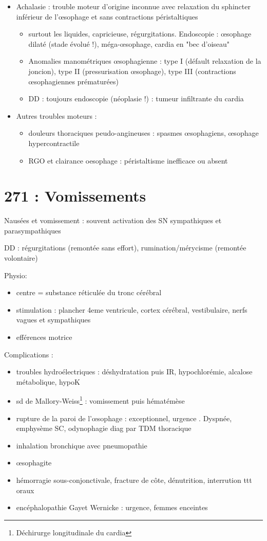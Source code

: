 \documentclass[11pt]{article}
\begin{document}
\begin{itemize}
\item Achalasie : trouble moteur d'origine inconnue avec relaxation du sphincter
inférieur de l'\oe{}sophage et sans contractions péristaltiques
\begin{itemize}
\item surtout les liquides, capricieuse, régurgitations. Endoscopie : \oe{}sophage
dilaté (stade évolué !), méga-\oe{}sophage, cardia en "bec d'oiseau"
\item Anomalies manométriques \oe{}sophagienne : type I (défault relaxation de la
joncion), type II (pressurisation \oe{}sophage), type III (contractions
\oe{}sophagiennes prématurées)
\item DD : toujours endoscopie (néoplasie !) : tumeur infiltrante du cardia
\end{itemize}
\item Autres troubles moteurs : 
\begin{itemize}
\item douleurs thoraciques peudo-angineuses : spasmes \oe{}sophagiens, \oe{}sophage
hypercontractile
\item RGO et clairance oesophage \dec : péristaltisme inefficace ou absent
\end{itemize}
\end{itemize}

\section{271 : Vomissements}
\label{sec:org322168c}
Nausées et vomissement : souvent activation des SN sympathiques et
parasympathiques

DD : régurgitations (remontée sans effort), rumination/mérycisme (remontée
volontaire)

Physio: 
\begin{itemize}
\item centre = substance réticulée du tronc cérébral
\item stimulation : plancher 4eme ventricule, cortex cérébral, vestibulaire, nerfs
vagues et sympathiques
\item efférences motrice
\end{itemize}

Complications :
\begin{itemize}
\item troubles hydroélectriques : déshydratation puis IR, hypochlorémie, alcalose
métabolique, hypoK
\item sd de Mallory-Weiss\footnote{Déchirurge longitudinale du cardia} : vomissement puis hématémèse
\item rupture de la paroi de l'\oe{}sophage : exceptionnel, urgence \faBomb. Dyspnée,
emphysème SC, odynophagie \thus diag par TDM thoracique
\item inhalation bronchique avec pneumopathie
\item \oe{}sophagite
\item hémorragie sous-conjonctivale, fracture de côte, dénutrition, interrution ttt
oraux
\item encéphalopathie Gayet Wernicke : urgence, femmes enceintes
\end{itemize}
\end{document}
